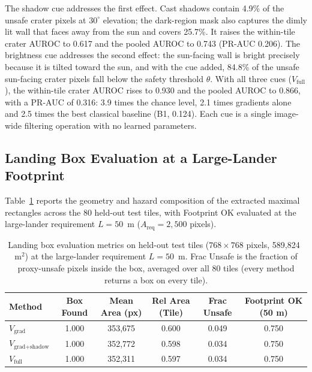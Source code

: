\documentclass{article}
\begin{document}
The shadow cue addresses the first effect. Cast shadows contain 4.9\% of the unsafe crater pixels at $30^\circ$ elevation; the dark-region mask also captures the dimly lit wall that faces away from the sun and covers 25.7\%. It raises the within-tile crater AUROC to 0.617 and the pooled AUROC to 0.743 (PR-AUC 0.206). The brightness cue addresses the second effect: the sun-facing wall is bright precisely because it is tilted toward the sun, and with the cue added, 84.8\% of the unsafe sun-facing crater pixels fall below the safety threshold $\theta$. With all three cues ($V_{\text{full}}$), the within-tile crater AUROC rises to 0.930 and the pooled AUROC to 0.866, with a PR-AUC of 0.316: 3.9 times the chance level, 2.1 times gradients alone and 2.5 times the best classical baseline (B1, 0.124). Each cue is a single image-wide filtering operation with no learned parameters.

\subsection{Landing Box Evaluation at a Large-Lander Footprint}
Table~\ref{tab:box} reports the geometry and hazard composition of the extracted maximal rectangles across the 80 held-out test tiles, with Footprint OK evaluated at the large-lander requirement $L = 50$~m ($A_{\text{req}} = 2{,}500$ pixels).

\begin{table}[!htb]
  \caption{Landing box evaluation metrics on held-out test tiles ($768 \times 768$ pixels, 589,824~$\text{m}^2$) at the large-lander requirement $L = 50$~m. Frac Unsafe is the fraction of proxy-unsafe pixels inside the box, averaged over all 80 tiles (every method returns a box on every tile).}
  \label{tab:box}
  \centering
  \small
  \begin{tabular}{lccccc}
    \toprule
    Method & Box Found & Mean Area (px) & Rel Area (Tile) & Frac Unsafe & Footprint OK (50 m) \\
    \midrule
    $V_{\text{grad}}$ & 1.000 & 353,675 & 0.600 & 0.049 & 0.750 \\
    $V_{\text{grad+shadow}}$ & 1.000 & 352,772 & 0.598 & 0.034 & 0.750 \\
    $V_{\text{full}}$ & 1.000 & 352,311 & 0.597 & 0.034 & 0.750 \\
    \bottomrule
  \end{tabular}
\end{table}
\end{document}
